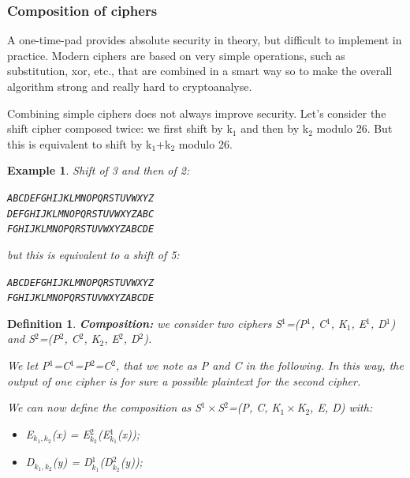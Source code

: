 \documentclass[a4paper, 12pt]{report}
\newtheorem{definition}{\textbf{Definition}}
\newtheorem{example}{\textbf{Example}}
\begin{document}
\subsubsection{Composition of ciphers}
A one-time-pad provides absolute security in theory, but difficult to implement in practice. Modern ciphers are based on very simple operations, such as substitution, xor, etc., that are combined in a smart way so to make the overall algorithm strong and really hard to cryptoanalyse.

Combining simple ciphers does not always improve security. Let's consider the shift cipher composed twice: we first shift by k$_1$ and then by k$_2$ modulo 26. But this is equivalent to shift by k$_1$+k$_2$ modulo 26.

\begin{example}
	Shift of 3 and then of 2:
	\begin{center}
		\texttt{ABCDEFGHIJKLMNOPQRSTUVWXYZ}\\
		\texttt{DEFGHIJKLMNOPQRSTUVWXYZABC}\\
		\texttt{FGHIJKLMNOPQRSTUVWXYZABCDE}\\
	\end{center}
	
	but this is equivalent to a shift of 5:
	\begin{center}
		\texttt{ABCDEFGHIJKLMNOPQRSTUVWXYZ}\\
		\texttt{FGHIJKLMNOPQRSTUVWXYZABCDE}\\
	\end{center}
\end{example}

\begin{definition}
	\textbf{Composition:} we consider two ciphers S$^1$=(P$^1$, C$^1$, K$_1$, E$^1$, D$^1$) and S$^2$=(P$^2$, C$^2$, K$_2$, E$^2$, D$^2$).
	
	We let P$^1$=C$^1$=P$^2$=C$^2$, that we note as P and C in the following. In this way, the output of one cipher is for sure a possible plaintext for the second cipher.
	
	We can now define the composition as S$^1\times$S$^2$=(P, C, K$_1\times$K$_2$, E, D) with:
	\begin{itemize}
		\item E$_{k_1,k_2}$(x) = E$^2_{k_2}$(E$^1_{k_1}$(x));
		\item D$_{k_1,k_2}$(y) = D$^1_{k_1}$(D$^2_{k_2}$(y));
	\end{itemize}
\end{definition}
\end{document}
